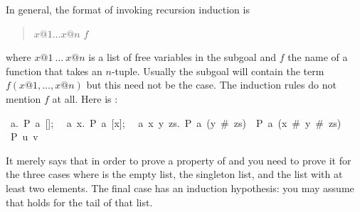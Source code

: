 \begin{isabellebody}
\begin{isamarkuptext}
In general, the format of invoking recursion induction is
\begin{quote}
 $x@1 \dots x@n$  $f$
\end{quote}%
where $x@1~\dots~x@n$ is a list of free variables in the subgoal and $f$ the
name of a function that takes an $n$-tuple. Usually the subgoal will
contain the term $f(x@1,\dots,x@n)$ but this need not be the case. The
induction rules do not mention $f$ at all. Here is :
\begin{isabelle}
{\isasymlbrakk}~{\isasymAnd}a.~P~a~[];\isanewline
~~{\isasymAnd}a~x.~P~a~[x];\isanewline
~~{\isasymAnd}a~x~y~zs.~P~a~(y~\#~zs)~{\isasymLongrightarrow}~P~a~(x~\#~y~\#~zs){\isasymrbrakk}\isanewline
{\isasymLongrightarrow}~P~u~v%
\end{isabelle}
It merely says that in order to prove a property  of  and
 you need to prove it for the three cases where  is the
empty list, the singleton list, and the list with at least two elements.
The final case has an induction hypothesis:  you may assume that 
holds for the tail of that list.%
\end{isamarkuptext}%
%
\isadelimtheory
%
\endisadelimtheory
%
\isatagtheory
%
\endisatagtheory
{\isafoldtheory}%
%
\isadelimtheory
%
\endisadelimtheory
\end{isabellebody}%
